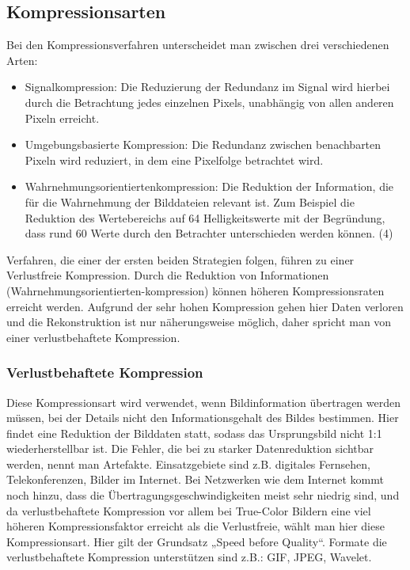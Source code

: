 \subsection{\textbf{Kompressionsarten}}

Bei den Kompressionsverfahren unterscheidet man zwischen drei verschiedenen Arten:
\begin{itemize}
\item  Signalkompression: Die Reduzierung der Redundanz im Signal wird hierbei durch die Betrachtung jedes einzelnen Pixels, unabhängig von allen anderen Pixeln erreicht.
\item  Umgebungsbasierte Kompression: Die Redundanz zwischen benachbarten Pixeln wird reduziert, in dem eine Pixelfolge betrachtet wird.
\item Wahrnehmungsorientiertenkompression: Die Reduktion der Information, die für die Wahrnehmung der Bilddateien relevant ist. Zum Beispiel die Reduktion des Wertebereichs auf 64 Helligkeitswerte mit der Begründung, dass rund 60 Werte durch den Betrachter unterschieden werden können. (4)
\end{itemize}
Verfahren, die einer der ersten beiden Strategien folgen, führen zu einer Verlustfreie Kompression. Durch die Reduktion von Informationen (Wahrnehmungsorientierten-kompression) können höheren Kompressionsraten erreicht werden. Aufgrund der sehr hohen Kompression gehen hier Daten verloren und die Rekonstruktion ist nur näherungsweise möglich, daher spricht man von einer verlustbehaftete Kompression.

\subsubsection{Verlustbehaftete Kompression}
Diese Kompressionsart wird verwendet, wenn Bildinformation übertragen werden müssen, bei der Details nicht den Informationsgehalt des Bildes bestimmen. Hier findet eine Reduktion der Bilddaten statt, sodass das Ursprungsbild nicht 1:1 wiederherstellbar ist. Die Fehler, die bei zu starker Datenreduktion sichtbar werden, nennt man Artefakte. Einsatzgebiete sind z.B. digitales Fernsehen, Telekonferenzen, Bilder im Internet. Bei Netzwerken wie dem Internet kommt noch hinzu, dass die Übertragungsgeschwindigkeiten meist sehr niedrig sind, und da verlustbehaftete Kompression vor allem bei True-Color Bildern eine viel höheren Kompressionsfaktor erreicht als die Verlustfreie, wählt man hier diese Kompressionsart. Hier gilt der Grundsatz „Speed before Quality“. Formate die verlustbehaftete Kompression unterstützen sind z.B.: GIF, JPEG, Wavelet.
